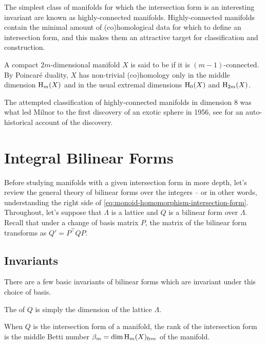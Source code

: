 The simplest class of manifolds for which the intersection form is an interesting invariant are known as highly-connected manifolds. Highly-connected manifolds contain the minimal amount of (co)homological data for which to define an intersection form, and this makes them an attractive target for classification and construction.
\begin{definition}
	A compact $2m$-dimensional manifold $X$ is said to be  if it is $(m-1)$-connected. By Poincar\'e duality, $X$ has non-trivial (co)homology only in the middle dimension $\operatorname{H}_m(X)$ and in the usual extremal dimensions $\operatorname{H}_0(X)$ and $\operatorname{H}_{2m}(X)$.
\end{definition}

\begin{remark}
	The attempted classification of highly-connected manifolds in dimension $8$ was what led Milnor to the first discovery of an exotic sphere in 1956, see \cite{milnor2000exotic} for an auto-historical account of the discovery.
\end{remark}

\section{Integral Bilinear Forms}\label{sec:integral-bilinear-forms}
Before studying manifolds with a given intersection form in more depth, let's review the general theory of bilinear forms over the integers -- or in other words, understanding the right side of \cref{eq:monoid-homomorphism-intersection-form}. Throughout, let's suppose that $\Lambda$ is a lattice and $Q$ is a bilinear form over $\Lambda$. Recall that under a change of basis matrix $P$, the matrix of the bilinear form transforms as $Q'= P^\intercal QP$. 

\subsection{Invariants}\label{sec:integral-bilinear-forms-invariants}
There are a few basic invariants of bilinear forms which are invariant under this choice of basis.

\begin{definition}[Rank]
	The  of $Q$ is simply the dimension of the lattice $\Lambda$.
\end{definition}

When $Q$ is the intersection form of a manifold, the rank of the intersection form is the middle Betti number $\beta_m = \dim \operatorname{H}_m(X)_{\textrm{free}}$ of the manifold.

